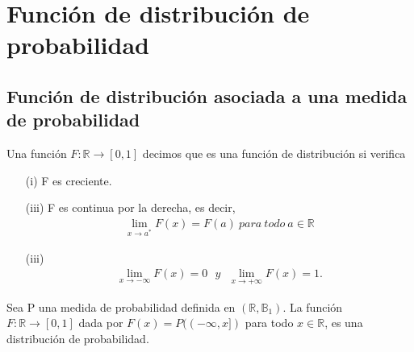 \chapter{Función de distribución de probabilidad}

\section{Función de distribución asociada a una medida de probabilidad}

\begin{defi}
    Una función $F: \mathbb{R} \longrightarrow [0,1]$ decimos que es una función de distribución si verifica
    \begin{enumerate}
        \item[(i)] F es creciente.
        \item[(iii)] F es continua por la derecha, es decir,
              \begin{align*}
                  \lim_{x \to a^*}{F(x)} = F(a) \ para \ todo \ a \in \mathbb{R}
              \end{align*}
        \item[(iii)]
              \begin{align*}
                  \lim_{x \to -\infty}{F(x) = 0} \ \ \ y \ \ \ \lim_{x \to +\infty}{F(x) = 1}.
              \end{align*}
    \end{enumerate}
\end{defi}

\begin{prop}
    Sea P una medida de probabilidad definida en $(\mathbb{R}, \mathbb{B}_1)$. La función $F: \mathbb{R} \longrightarrow [0,1]$ dada por $F(x) = P((-\infty,x])$ para todo $x \in \mathbb{R}$, es una distribución de probabilidad.
\end{prop}

